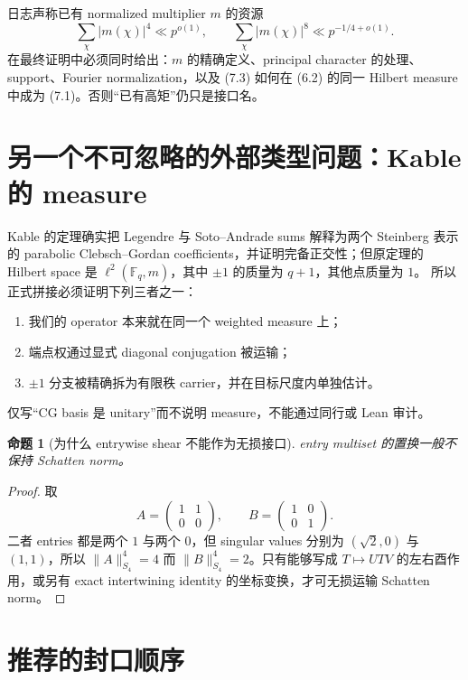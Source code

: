 \documentclass[11pt,a4paper]{ctexart}
\newtheorem{proposition}[theorem]{命题}
\theoremstyle{definition}
\newcommand{\F}{\mathbb F}
\newcommand{\1}{\mathbf 1}
\begin{document}
日志声称已有 normalized multiplier $m$ 的资源
\[
\sum_\chi|m(\chi)|^4\ll p^{o(1)},
\qquad
\sum_\chi|m(\chi)|^8\ll p^{-1/4+o(1)}.
\tag{7.3}
\]
在最终证明中必须同时给出：$m$ 的精确定义、principal character 的处理、
support、Fourier normalization，以及 (7.3) 如何在 (6.2) 的同一 Hilbert
measure 中成为 (7.1)。否则“已有高矩”仍只是接口名。

\section{另一个不可忽略的外部类型问题：Kable 的 measure}

Kable 的定理确实把 Legendre 与 Soto--Andrade sums 解释为两个 Steinberg
表示的 parabolic Clebsch--Gordan coefficients，并证明完备正交性；但原定理的
Hilbert space 是 $\ell^2(\F_q,m)$，其中 $\pm1$ 的质量为 $q+1$，其他点质量为 $1$。
所以正式拼接必须证明下列三者之一：
\begin{enumerate}
\item 我们的 operator 本来就在同一个 weighted measure 上；
\item 端点权通过显式 diagonal conjugation 被运输；
\item $\pm1$ 分支被精确拆为有限秩 carrier，并在目标尺度内单独估计。
\end{enumerate}
仅写“CG basis 是 unitary”而不说明 measure，不能通过同行或 Lean 审计。

\begin{proposition}[为什么 entrywise shear 不能作为无损接口]
entry multiset 的置换一般不保持 Schatten norm。
\end{proposition}

\begin{proof}
取
\[
A=\begin{pmatrix}1&1\\0&0\end{pmatrix},\qquad
B=\begin{pmatrix}1&0\\0&1\end{pmatrix}.
\]
二者 entries 都是两个 $1$ 与两个 $0$，但 singular values 分别为
$(\sqrt2,0)$ 与 $(1,1)$，所以 $\|A\|_{S_4}^4=4$ 而
$\|B\|_{S_4}^4=2$。只有能够写成 $T\mapsto UTV$ 的左右酉作用，或另有
exact intertwining identity 的坐标变换，才可无损运输 Schatten norm。
\end{proof}

\section{推荐的封口顺序}
\end{document}

